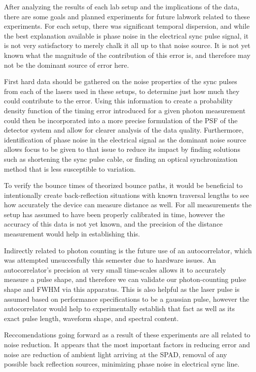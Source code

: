 \documentclass[a4paper]{article}
\begin{document}
After analyzing the results of each lab setup and the implications of the data, there are some goals and planned experiments for future labwork related to these experiments. For each setup, there was significant temporal dispersion, and while the best explanation available is phase noise in the electrical sync pulse signal, it is not very satisfactory to merely chalk it all up to that noise source. It is not yet known what the magnitude of the contribution of this error is, and therefore may not be the dominant source of error here.

First hard data should be gathered on the noise properties of the sync pulses from each of the lasers used in these setups, to determine just how much they could contribute to the error. Using this information to create a probability density function of the timing error introduced for a given photon measurement could then be incorporated into a more precise formulation of the PSF of the detector system and allow for clearer analysis of the data quality. Furthermore, identification of phase noise in the electrical signal as the dominant noise source allows focus to be given to that issue to reduce its impact by finding solutions such as shortening the sync pulse cable, or finding an optical synchronization method that is less susceptible to variation.

To verify the bounce times of theorized bounce paths, it would be beneficial to intentionally create back-reflection situations with known traversal lengths to see how accurately the device can measure distance as well. For all measurements the setup has assumed to have been properly calibrated in time, however the accuracy of this data is not yet known, and the precision of the distance measurement would help in establishing this.

Indirectly related to photon counting is the future use of an autocorrelator, which was attempted unsuccesfully this semester due to hardware issues. An autocorrelator's precision at very small time-scales allows it to accurately measure a pulse shape, and therefore we can validate our photon-counting pulse shape and FWHM via this apparatus. This is also helpful as the laser pulse is assumed based on performance specifications to be a gaussian pulse, however the autocorrelator would help to experimentally establish that fact as well as its exact pulse length, waveform shape, and spectral content.

Reccomendations going forward as a result of these experiments are all related to noise reduction. It appears that the most important factors in reducing error and noise are reduction of ambient light arriving at the SPAD, removal of any possible back reflection sources, minimizing phase noise in electrical sync line.
\end{document}
